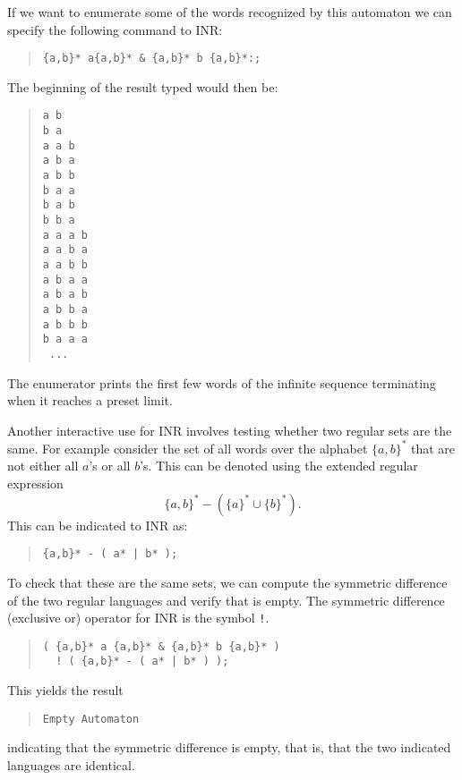 If we want to enumerate some of the words recognized by this automaton we
can specify the following command to INR:
\begin{quote}
\begin{verbatim}
{a,b}* a{a,b}* & {a,b}* b {a,b}*:;
\end{verbatim}
\end{quote}
The beginning of the result typed would then be:
\begin{quote}
\begin{verbatim}
a b
b a
a a b
a b a
a b b
b a a
b a b
b b a
a a a b
a a b a
a a b b
a b a a
a b a b
a b b a
a b b b
b a a a
 ...
\end{verbatim}
\end{quote}
The enumerator prints the first few words of the infinite sequence
terminating when it reaches a preset limit.

Another interactive use for INR involves testing whether two regular sets
are the same.
For example consider the set of all words over the alphabet $\{a,b\}^*$
that are not either all $a$'s or all $b$'s.
This can be denoted using the extended regular expression
$$\{a,b\}^* - ( \{a\}^* \cup \{b\}^* ).$$
This can be indicated to INR as:
\begin{quote}
\begin{verbatim}
{a,b}* - ( a* | b* );
\end{verbatim}
\end{quote}
To check that these are the same sets, we can compute the symmetric
difference of the two regular languages and verify that is empty.
The symmetric difference (exclusive or) operator for INR is the symbol
{\tt !}.
\begin{quote}
\begin{verbatim}
( {a,b}* a {a,b}* & {a,b}* b {a,b}* )
  ! ( {a,b}* - ( a* | b* ) );
\end{verbatim}
\end{quote}
This yields the result
\begin{quote}
\begin{verbatim}
Empty Automaton
\end{verbatim}
\end{quote}
indicating that the symmetric difference is empty, that is, that the two
indicated languages are identical.

